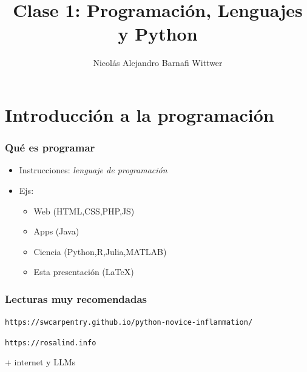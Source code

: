 \documentclass[14pt,aspectratio=169,xcolor=dvipsnames]{beamer}
\title[short title]{Clase 1: Programación, Lenguajes y Python}
\subtitle{}
\author[NA Barnafi] {Nicolás Alejandro Barnafi Wittwer}
\institute[UC|CMM] 
{
    Pontificia Universidad Católica de Chile \\
    Centro de Modelamiento Matemático
}
\date{}
\begin{document}
\begin{frame}
    \maketitle
\end{frame}
\section{Introducción a la programación}
\begin{frame}[t]\frametitle{Qué es programar}

\begin{itemize}
    \item Instrucciones: \emph{lenguaje de programación}
    \item Ejs: 
        \begin{itemize}
            \item Web (HTML,CSS,PHP,JS)
            \item Apps (Java)
            \item {Ciencia (Python,R,Julia,MATLAB)}
            \item Esta presentación (\LaTeX)
        \end{itemize}
\end{itemize}

\vspace{1cm}
\pause {}
\end{frame}
\begin{frame}\frametitle{Lecturas muy recomendadas}
\texttt{https://swcarpentry.github.io/python-novice-inflammation/}

\texttt{https://rosalind.info}

+ internet y LLMs
\end{frame}
\end{document}
